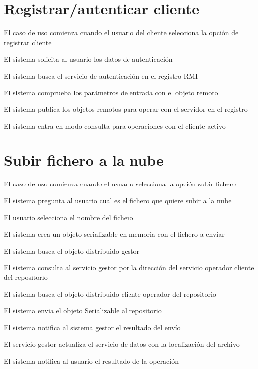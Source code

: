 \section{Registrar/autenticar cliente}

\begin{compactenum}
	\item El caso de uso comienza cuando el usuario del cliente selecciona la opción de registrar cliente
	\item El sistema solicita al usuario los datos de autenticación
	\item El sistema busca el servicio de autenticación en el registro RMI
	\item El sistema comprueba los parámetros de entrada con el objeto remoto
	\item El sistema publica los objetos remotos para operar con el servidor en el registro
	\item El sistema entra en modo consulta para operaciones con el cliente activo
\end{compactenum}

\section{Subir fichero a la nube}
\begin{compactenum}
	\item El caso de uso comienza cuando el usuario selecciona la opción subir fichero
	\item El sistema pregunta al usuario cual es el fichero que quiere subir a la nube
	\item El usuario selecciona el nombre del fichero
	\item El sistema crea un objeto serializable en memoria con el fichero a enviar
	\item El sistema busca el objeto distribuido gestor
	\item El sistema consulta al servicio gestor por la dirección del servicio operador cliente del repositorio
	\item El sistema busca el objeto distribuido cliente operador del repositorio
	\item El sistema envia el objeto Serializable al repositorio
	\item El sistema notifica al sistema gestor el resultado del envío
	\item El servicio gestor actualiza el servicio de datos con la localización del archivo
	\item El sistema notifica al usuario el resultado de la operación
\end{compactenum}

